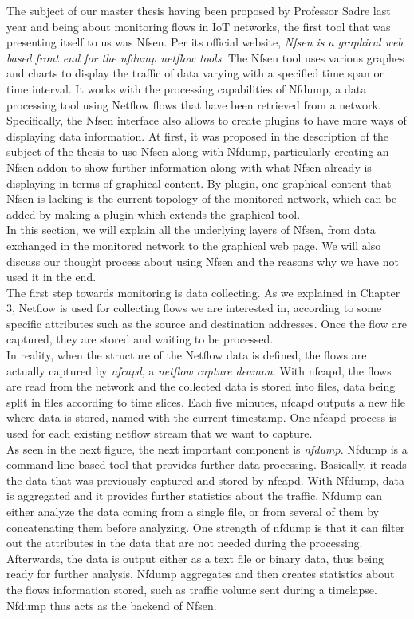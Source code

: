 The subject of our master thesis having been proposed by Professor Sadre last year and being about monitoring flows in IoT networks, the first tool that was presenting itself to us was Nfsen. Per its official website, \textit{Nfsen is a graphical web based front end for the nfdump netflow tools}. The Nfsen tool uses various graphes and charts to display the traffic of data varying with a specified time span or time interval. It works with the processing capabilities of Nfdump, a data processing tool using Netflow flows that have been retrieved from a network. Specifically, the Nfsen interface also allows to create plugins to have more ways of displaying data information. At first, it was proposed in the description of the subject of the thesis to use Nfsen along with Nfdump, particularly creating an Nfsen addon to show further information along with what Nfsen already is displaying in terms of graphical content. By plugin, one graphical content that Nfsen is lacking is the current topology of the monitored network, which can be added by making a plugin which extends the graphical tool.\\

In this section, we will explain all the underlying layers of Nfsen, from data exchanged in the monitored network to the graphical web page. We will also discuss our thought process about using Nfsen and the reasons why we have not used it in the end.\\

The first step towards monitoring is data collecting. As we explained in Chapter 3, Netflow is used for collecting flows we are interested in, according to some specific attributes such as the source and destination addresses. Once the flow are captured, they are stored and waiting to be processed. \\

In reality, when the structure of the Netflow data is defined, the flows are actually captured by \textit{nfcapd}, a \textit{netflow capture deamon}. With nfcapd, the flows are read from the network and the collected data is stored into files, data being split in files according to time slices. Each five minutes, nfcapd outputs a new file where data is stored, named with the current timestamp. One nfcapd process is used for each existing netflow stream that we want to capture.\\

As seen in the next figure, the next important component is \textit{nfdump}. Nfdump is a command line based tool that provides further data processing. Basically, it reads the data that was previously captured and stored by nfcapd. With Nfdump, data is aggregated and it provides further statistics about the traffic. Nfdump can either analyze the data coming from a single file, or from several of them by concatenating them before analyzing. One strength of nfdump is that it can filter out the attributes in the data that are not needed during the processing. Afterwards, the data is output either as a text file or binary data, thus being ready for further analysis. Nfdump aggregates and then creates statistics about the flows information stored, such as traffic volume sent during a timelapse. Nfdump thus acts as the backend of Nfsen.\\

